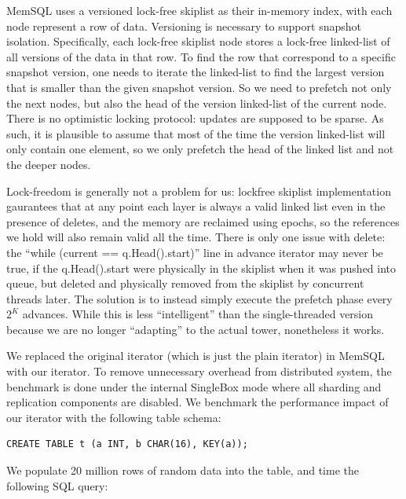 \documentclass[11pt, usletter]{article}
\begin{document}
MemSQL uses a versioned lock-free skiplist as their in-memory index, with each node represent a row of data. 
Versioning is necessary to support snapshot isolation.
Specifically, each lock-free skiplist node stores a lock-free linked-list of all versions of the data in that row.
To find the row that correspond to a specific snapshot version,
one needs to iterate the linked-list to find the largest version that is smaller than the given snapshot version. 
So we need to prefetch not only the next nodes, but also the head of the version linked-list of the current node.
There is no optimistic locking protocol: updates are supposed to be sparse. 
As such, it is plausible to assume that most of the time the version linked-list will only contain one element, 
so we only prefetch the head of the linked list and not the deeper nodes. 

Lock-freedom is generally not a problem for us: 
lockfree skiplist implementation gaurantees that 
at any point each layer is always a valid linked list even in the presence of deletes, 
and the memory are reclaimed using epochs, 
so the references we hold will also remain valid all the time. 
There is only one issue with delete: the ``while (current == q.Head().start)'' line in advance iterator 
may never be true, if the q.Head().start were physically in the skiplist when it was pushed into queue, 
but deleted and physically removed from the skiplist by concurrent threads later. 
The solution is to instead simply execute the prefetch phase every $2^K$ advances. 
While this is less ``intelligent'' than the single-threaded version 
because we are no longer ``adapting'' to the actual tower, nonetheless it works.

We replaced the original iterator (which is just the plain iterator) in MemSQL with our iterator. 
To remove unnecessary overhead from distributed system, 
the benchmark is done under the internal SingleBox mode where all sharding and replication components are disabled.
We benchmark the performance impact of our iterator with the following table schema:

\singlespacing\begin{codebox}
\begin{verbatim}
CREATE TABLE t (a INT, b CHAR(16), KEY(a));
\end{verbatim}
\end{codebox}\doublespacing

We populate 20 million rows of random data into the table, and time the following SQL query:
\end{document}
